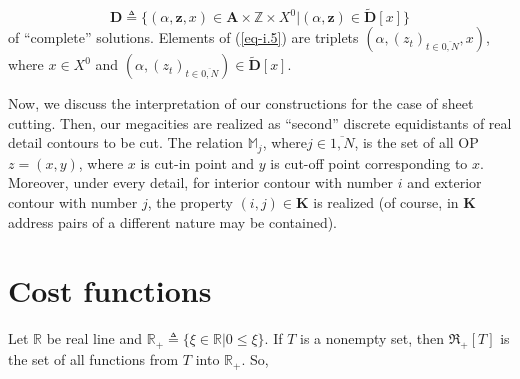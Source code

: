 \documentclass{article}
\begin{document}
\begin{equation}
  \label{eq-i.5}
  \mathbf D \triangleq
  \{
    (\alpha,\mathbf z, x) \in \mathbf A \times \mathbb Z \times X^0
  |
    (\alpha,\mathbf z) \in \tilde {\mathbf D}[x]
  \}
\end{equation}
of ``complete'' solutions.
Elements of (\ref{eq-i.5})
are triplets
$(\alpha,(z_t)_{t \in \overline{0,N}}, x)$,
where
$x \in X^0$
and
$(\alpha,(z_t)_{t \in \overline{0,N}}) \in \tilde {\mathbf D}[x]$.

Now, we discuss the interpretation of our constructions
for the case of sheet cutting.
Then, our megacities are realized as ``second''
discrete equidistants of real detail contours to be cut.
The relation
$\mathbb M_j$,
where$j \in \overline{1,N}$,
is the set of all OP
$z=(x,y)$,
where
$x$ is cut-in point and
$y$ is cut-off point corresponding to $x$.
Moreover,
under every detail,
for interior contour with number $i$
and exterior contour with number $j$,
the property
$(i,j) \in \mathbf K$
is realized
(of course, in $\mathbf K$
address pairs of a different nature
may be contained).

\section*{Cost functions}

Let
$\mathbb R$
be real line and
$\mathbb R_+ \triangleq \{ \xi \in \mathbb R | 0 \leqslant \xi\}$.
If $T$ is a nonempty set,
then
$\mathfrak R_+[T]$
is the set of all functions from $T$
into $\mathbb R_+$.
So,
\end{document}
